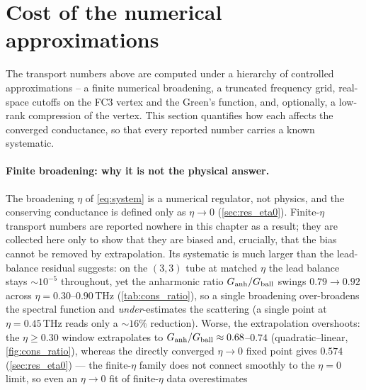 \section{Cost of the numerical approximations}
\label{sec:res_approx}

The transport numbers above are computed under a hierarchy of controlled
approximations -- a finite numerical broadening, a truncated frequency grid,
real-space cutoffs on the FC3 vertex and the Green's function, and, optionally, a
low-rank compression of the vertex. This section quantifies how each affects the
converged conductance, so that every reported number carries a known systematic.

\paragraph{Finite broadening: why it is not the physical answer.}
The broadening $\eta$ of \cref{eq:system} is a numerical regulator, not physics, and
the conserving conductance is defined only as $\eta\to0$ (\cref{sec:res_eta0}).
Finite-$\eta$ transport numbers are reported nowhere in this chapter as a result;
they are collected here only to show that they are biased and, crucially, that the
bias cannot be removed by extrapolation. Its systematic is much larger than the
lead-balance residual suggests: on the $(3,3)$ tube at matched $\eta$ the
lead balance stays $\sim10^{-5}$ throughout, yet the anharmonic ratio
$G_{\rm anh}/G_{\rm ball}$ swings $0.79\to0.92$ across $\eta=0.30$--$0.90$\,THz
(\cref{tab:cons_ratio}), so a single broadening over-broadens the spectral function
and \emph{under}-estimates the scattering (a single point at $\eta=0.45$\,THz
reads only a $\sim16\%$ reduction). Worse, the extrapolation overshoots: the
$\eta\ge0.30$ window extrapolates to $G_{\rm anh}/G_{\rm ball}\approx0.68$--$0.74$
(quadratic--linear, \cref{fig:cons_ratio}), whereas the directly converged
$\eta\to0$ fixed point gives
$0.574$ (\cref{sec:res_eta0}) --- the finite-$\eta$ family does not connect smoothly
to the $\eta=0$ limit, so even an $\eta\to0$ fit of finite-$\eta$ data overestimates
